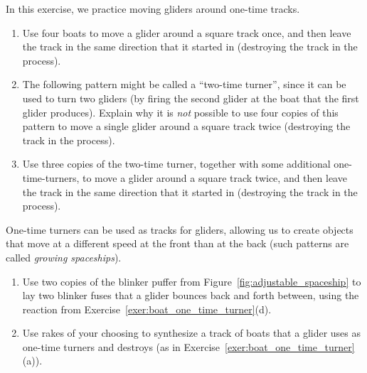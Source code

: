 \begin{multicols}{2}
	
	\mfilbreak
	
	
	\begin{problemstar}\label{exer:turner_tracks}
		In this exercise, we practice moving gliders around one-time tracks.
		\begin{enumerate}[label=\bf\color{ocre}(\alph*)]
			\item Use four boats to move a glider around a square track once, and then leave the track in the same direction that it started in (destroying the track in the process).
			
			\item The following pattern might be called a ``two-time turner'', since it can be used to turn two gliders (by firing the second glider at the boat that the first glider produces). Explain why it is \emph{not} possible to use four copies of this pattern to move a single glider around a square track twice (destroying the track in the process).
			\begin{center}
			\end{center}
			
			\item Use three copies of the two-time turner, together with some additional one-time-turners, to move a glider around a square track twice, and then leave the track in the same direction that it started in (destroying the track in the process).
		\end{enumerate}
	\end{problemstar}
	
	
	\mfilbreak
	
	
	\begin{problemstar}\label{exer:one_time_track}
		One-time turners can be used as tracks for gliders, allowing us to create objects that move at a different speed at the front than at the back (such patterns are called \emph{growing spaceships}).
		\begin{enumerate}[label=\bf\color{ocre}(\alph*)]
			\item Use two copies of the blinker puffer from Figure~\ref{fig:adjustable_spaceship} to lay two blinker fuses that a glider bounces back and forth between, using the reaction from Exercise~\ref{exer:boat_one_time_turner}(d).
			
			\item Use rakes of your choosing to synthesize a track of boats that a glider uses as one-time turners and destroys (as in Exercise~\ref{exer:boat_one_time_turner}(a)).
		\end{enumerate}
	\end{problemstar}
	

\end{multicols}

